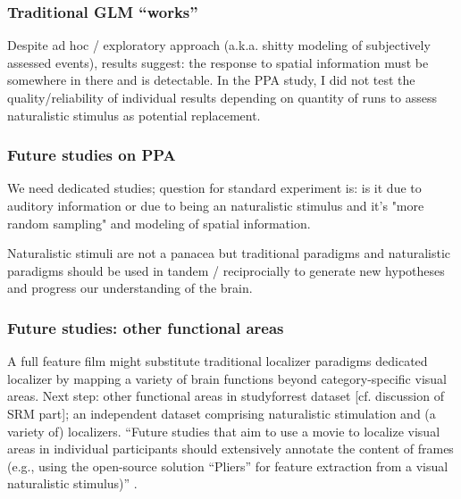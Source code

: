 \subsubsection{Traditional GLM ``works''}
%
Despite ad hoc / exploratory approach (a.k.a. shitty modeling of subjectively
assessed events), results suggest: the response to spatial information must be
somewhere in there and is detectable.
%
In the PPA study,  I did not test the quality/reliability of individual results
depending on quantity of runs to assess naturalistic stimulus as potential
replacement.


\subsubsection{Future studies on PPA}

%
We need dedicated studies; question for standard experiment is: is it due to
auditory information or due to being an naturalistic stimulus and it's "more
random sampling" and modeling of spatial information.

%
Naturalistic stimuli are not a panacea but traditional paradigms and
naturalistic paradigms should be used in tandem / reciprocially to generate new
hypotheses and progress our understanding of the brain.


\subsubsection{Future studies: other functional areas}
%
A full feature film might substitute traditional localizer paradigms dedicated
localizer by mapping a variety of brain functions beyond category-specific
visual areas.
%
Next step: other functional areas in studyforrest dataset [cf. discussion of SRM
part]; an independent dataset comprising naturalistic stimulation and (a variety
of) localizers.
%
``Future studies that aim to use a movie to localize visual areas in individual
participants should extensively annotate the content of frames (e.g., using the
open-source solution ``Pliers''\citep{mcnamara2017developing} for feature
extraction from a visual naturalistic stimulus)''
\citep{haeusler2022processing}.


